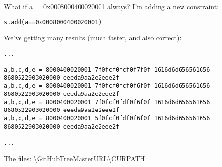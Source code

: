 What if a==0x0008000400020001 always?
I'm adding a new constraint:

\begin{lstlisting}
s.add(a==0x0008000400020001)
\end{lstlisting}

We've getting many results (much faster, and also correct):

\begin{lstlisting}
...

a,b,c,d,e = 8000400020001 7f0fcf0fcf0f7f0f 1616d6d656561656 8680522903020000 eeeda9aa2e2eee2f
a,b,c,d,e = 8000400020001 7f0fcf0fcf0f6f0f 1616d6d656561656 8680522903020000 eeeda9aa2e2eee2f
a,b,c,d,e = 8000400020001 7f0fcf0fdf0f6f0f 1616d6d656561656 8680522903020000 eeeda9aa2e2eee2f
a,b,c,d,e = 8000400020001 5f0fcf0fdf0f6f0f 1616d6d656561656 8680522903020000 eeeda9aa2e2eee2f

...
\end{lstlisting}

The files: \url{\GitHubTreeMasterURL\CURPATH}

